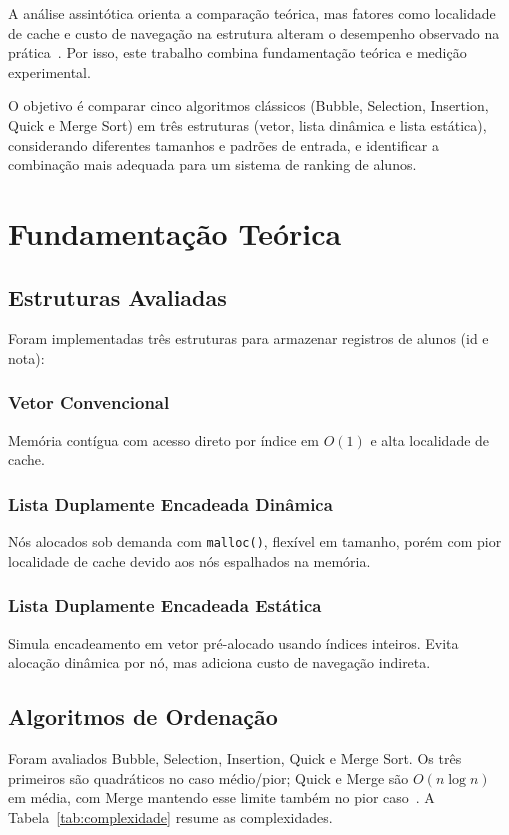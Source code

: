 \documentclass[conference]{IEEEtran}
\begin{document}
A análise assintótica orienta a comparação teórica, mas fatores como localidade de cache e custo de navegação na estrutura alteram o desempenho observado na prática~\cite{knuth,ziviani}. Por isso, este trabalho combina fundamentação teórica e medição experimental.

O objetivo é comparar cinco algoritmos clássicos (Bubble, Selection, Insertion, Quick e Merge Sort) em três estruturas (vetor, lista dinâmica e lista estática), considerando diferentes tamanhos e padrões de entrada, e identificar a combinação mais adequada para um sistema de ranking de alunos.

\section{Fundamentação Teórica}

\subsection{Estruturas Avaliadas}

Foram implementadas três estruturas para armazenar registros de alunos (id e nota):

\subsubsection{Vetor Convencional}
Memória contígua com acesso direto por índice em $O(1)$ e alta localidade de cache.

\subsubsection{Lista Duplamente Encadeada Dinâmica}
Nós alocados sob demanda com \texttt{malloc()}, flexível em tamanho, porém com pior localidade de cache devido aos nós espalhados na memória.

\subsubsection{Lista Duplamente Encadeada Estática}
Simula encadeamento em vetor pré-alocado usando índices inteiros. Evita alocação dinâmica por nó, mas adiciona custo de navegação indireta.

\subsection{Algoritmos de Ordenação}

Foram avaliados Bubble, Selection, Insertion, Quick e Merge Sort. Os três primeiros são quadráticos no caso médio/pior; Quick e Merge são $O(n \log n)$ em média, com Merge mantendo esse limite também no pior caso~\cite{cormen,knuth}. A Tabela~\ref{tab:complexidade} resume as complexidades.
\end{document}

